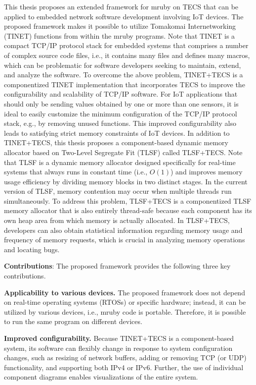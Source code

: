 \documentclass[a4j,12pt,oneside,openany,english]{jsbook}
\begin{document}
This thesis proposes an extended framework for mruby on TECS that can be applied to embedded network software development involving IoT devices.
The proposed framework makes it possible to utilize Tomakomai Internetworking (TINET) functions from within the mruby programs.
Note that TINET is a compact TCP/IP protocol stack for embedded systems \cite{url:TINET} that comprises a number of complex source code files, i.e., it contains many files and defines many macros, which can be problematic for software developers seeking to maintain, extend, and analyze the software.
To overcome the above problem, TINET+TECS is a componentized TINET implementation that incorporates TECS to improve the configurability and scalability of TCP/IP software.
For IoT applications that should only be sending values obtained by one or more than one sensors, it is ideal to easily customize the minimum configuration of the TCP/IP protocol stack, e.g., by removing unused functions.
This improved configurability also leads to satisfying strict memory constraints of IoT devices.
In addition to TINET+TECS, this thesis proposes a component-based dynamic memory allocator based on Two-Level Segregate Fit (TLSF) called TLSF+TECS.
Note that TLSF is a dynamic memory allocator designed specifically for real-time systems that always runs in constant time (i.e., $O(1)$) and improves memory usage efficiency by dividing memory blocks in two distinct stages.
In the current version of TLSF, memory contention may occur when multiple threads run simultaneously.
To address this problem, TLSF+TECS is a componentized TLSF memory allocator that is also entirely thread-safe because each component has its own heap area from which memory is actually allocated.
In TLSF+TECS, developers can also obtain statistical information regarding memory usage and frequency of memory requests, which is crucial in analyzing memory operations and locating bugs.



{\bf Contributions}: The proposed framework provides the following three key contributions.

{\bf Applicability to various devices.}
The proposed framework does not depend on real-time operating systems (RTOSs) or specific hardware; instead, it can be utilized by various devices, i.e., mruby code is portable.
Therefore, it is possible to run the same program on different devices.

{\bf Improved configurability.}
Because TINET+TECS is a component-based system, its software can flexibly change in response to system configuration changes, such as resizing of network buffers, adding or removing TCP (or UDP) functionality, and supporting both IPv4 or IPv6.
Further, the use of individual component diagrams enables visualizations of the entire system.
\end{document}
